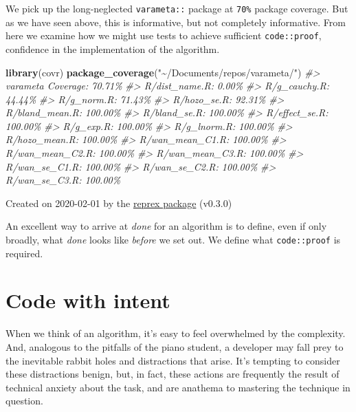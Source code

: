 \documentclass[
]{article}
\newenvironment{Shaded}{\begin{snugshade}}{\end{snugshade}}
\newcommand{\CommentTok}[1]{\textcolor[rgb]{0.56,0.35,0.01}{\textit{#1}}}
\newcommand{\KeywordTok}[1]{\textcolor[rgb]{0.13,0.29,0.53}{\textbf{#1}}}
\newcommand{\NormalTok}[1]{#1}
\newcommand{\StringTok}[1]{\textcolor[rgb]{0.31,0.60,0.02}{#1}}
\begin{document}
We pick up the long-neglected \texttt{varameta::} package at \texttt{70\%} package coverage. But as we have seen above, this is informative, but not completely informative. From here we examine how we might use tests to achieve sufficient \texttt{code::proof}, confidence in the implementation of the algorithm.

\begin{Shaded}
\begin{Highlighting}[]
\KeywordTok{library}\NormalTok{(covr)}
\KeywordTok{package\_coverage}\NormalTok{(}\StringTok{"\textasciitilde{}/Documents/repos/varameta/"}\NormalTok{)}
\CommentTok{\#> varameta Coverage: 70.71\%}
\CommentTok{\#> R/dist\_name.R: 0.00\%}
\CommentTok{\#> R/g\_cauchy.R: 44.44\%}
\CommentTok{\#> R/g\_norm.R: 71.43\%}
\CommentTok{\#> R/hozo\_se.R: 92.31\%}
\CommentTok{\#> R/bland\_mean.R: 100.00\%}
\CommentTok{\#> R/bland\_se.R: 100.00\%}
\CommentTok{\#> R/effect\_se.R: 100.00\%}
\CommentTok{\#> R/g\_exp.R: 100.00\%}
\CommentTok{\#> R/g\_lnorm.R: 100.00\%}
\CommentTok{\#> R/hozo\_mean.R: 100.00\%}
\CommentTok{\#> R/wan\_mean\_C1.R: 100.00\%}
\CommentTok{\#> R/wan\_mean\_C2.R: 100.00\%}
\CommentTok{\#> R/wan\_mean\_C3.R: 100.00\%}
\CommentTok{\#> R/wan\_se\_C1.R: 100.00\%}
\CommentTok{\#> R/wan\_se\_C2.R: 100.00\%}
\CommentTok{\#> R/wan\_se\_C3.R: 100.00\%}
\end{Highlighting}
\end{Shaded}

Created on 2020-02-01 by the \href{https://reprex.tidyverse.org}{reprex package} (v0.3.0)

An excellent way to arrive at \emph{done} for an algorithm is to define, even if only broadly, what \emph{done} looks like \emph{before} we set out. We define what \texttt{code::proof} is required.

\hypertarget{code-with-intent}{%
\section{Code with intent}\label{code-with-intent}}

When we think of an algorithm, it's easy to feel overwhelmed by the complexity. And, analogous to the pitfalls of the piano student, a developer may fall prey to the inevitable rabbit holes and distractions that arise. It's tempting to consider these distractions benign, but, in fact, these actions are frequently the result of technical anxiety about the task, and are anathema to mastering the technique in question.
\end{document}
